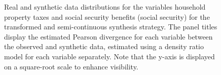 \documentclass[
]{article}
\begin{document}
\linespread{1}

\begin{figure}[t]


\caption{\label{fig-application-distributions}Real and synthetic data
distributions for the variables household property taxes and social
security benefits (social security) for the transformed and
semi-continuous synthesis strategy. The panel titles display the
estimated Pearson divergence for each variable between the observed and
synthetic data, estimated using a density ratio model for each variable
separately. Note that the y-axis is displayed on a square-root scale to
enhance visibility.}

\end{figure}%

\linespread{2}
\end{document}
